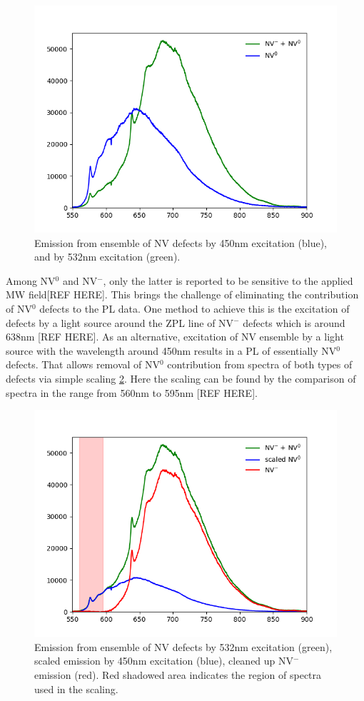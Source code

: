 \begin{figure}[H]
	\centering
	\includegraphics[angle=0,origin=c,width =
	 0.8\linewidth]{Section_ODMR/Figures/rawSpectraNVdefects.png}
	\caption{Emission from ensemble of NV defects by 450nm excitation 
		(blue), and by 532nm excitation (green).}
	\label{fig:rawNVEmission}
\end{figure}

Among NV$^{0}$ and NV$^{-}$, only the latter is reported to be sensitive
to the applied MW field[REF HERE]. This brings the challenge of eliminating
the contribution of NV$^{0}$ defects to the PL data. One method to achieve
this is the excitation of defects by a light source around the ZPL line of
NV$^{-}$ defects which is around 638nm [REF HERE]. As an alternative, 
excitation of NV ensemble by a light source with the wavelength around 450nm
results in a PL of essentially NV$^{0}$ defects. That allows removal of 
NV$^{0}$ contribution from spectra of both types of defects via simple 
scaling \ref{fig:cleanedUpSpectraNVdefects}. Here the scaling can be found by 
the comparison of spectra in the range from 560nm to 595nm [REF HERE].

\begin{figure}[H]
	\centering
	\includegraphics[angle=0,origin=c,width =
	0.8\linewidth]{Section_ODMR/Figures/cleanedUpSpectraNVdefects.png}
	\caption{Emission from ensemble of NV defects by 532nm excitation 
		(green), scaled emission by 450nm excitation (blue), cleaned up
		NV$^{-}$ emission (red). Red shadowed area indicates the region
		of spectra used in the scaling.}
	\label{fig:cleanedUpSpectraNVdefects}
\end{figure}

